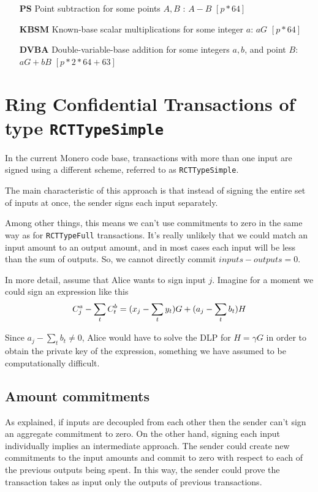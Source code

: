 \begin{itemize}
    \setlength\itemsep{\listspace}
    \item [\textbf{PS}] Point subtraction for some points $A, B$ : $A - B$ \quad \([p*64]\)
    \item [\textbf{KBSM}] Known-base scalar multiplications for some integer $a$: $a G$ \quad \([p*64]\)
    \item [\textbf{DVBA}] Double-variable-base addition for some integers $a, b$, and point $B$: $a G + b B$ \quad \([p*2*64 + 63]\)
\end{itemize}


\section{Ring Confidential Transactions of type {\tt RCTTypeSimple}}
\label{sec:RCTTypeSimple}

In the current Monero code base, transactions with more than one input are signed using a different scheme, referred to as {\tt RCTTypeSimple}.

The main characteristic of this approach is that instead of signing the entire set of inputs at once, the sender signs each input separately.

Among other things, this means we can’t use commitments to zero in the same way as for {\tt RCTTypeFull} transactions. It's really unlikely that we could match an input amount to an output amount, and in most cases each input will be less than the sum of outputs. So, we cannot directly commit $inputs - outputs = 0$.

In more detail, assume that Alice wants to sign input $j$. Imagine for a moment we could sign an expression like this\\
\[  C^a_{j} - \sum\limits_t C^b_{t} \\
= (x_j -  \sum_t y_t) G + (a_j - \sum\limits_t  b_t) H \]

Since \(a_j - \sum\limits_t  b_t \ne 0\), Alice would have to solve the DLP for \(H = \gamma G\) in order to obtain the private key of the expression, something we have assumed to be computationally difficult.


\subsection{Amount commitments}
\label{RCTTypeSimple-commitments}

As explained, if inputs are decoupled from each other then the sender can't sign an aggregate commitment to zero. On the other hand, signing each input individually implies an intermediate approach. The sender could create new commitments to the input amounts and commit to zero with respect to each of the previous outputs being spent. In this way, the sender could prove the transaction takes as input only the outputs of previous transactions.

